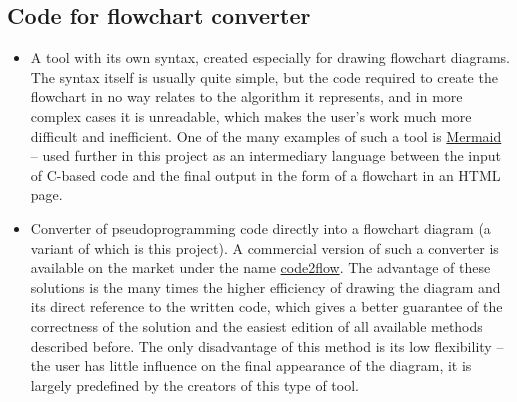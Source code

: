 	\subsection{Code for flowchart converter} 	
	\begin{itemize}
	\item
	A tool with its own syntax, created especially for drawing flowchart diagrams. The syntax itself is usually quite simple, but the code required to create the flowchart in no way relates to the algorithm it represents, and in more complex cases it is unreadable, which makes the user's work much more difficult and inefficient. One of the many examples of such a tool is \href{https://mermaid-js.github.io/mermaid/#/}{Mermaid} -- used further in this project as an intermediary language between the input of C-based code and the final output in the form of a flowchart in an HTML page.
	
	\item
	Converter of pseudoprogramming code directly into a flowchart diagram (a variant of which is this project). A commercial version of such a converter is available on the market under the name \href{https://code2flow.com}{code2flow}. The advantage of these solutions is the many times the higher efficiency of drawing the diagram and its direct reference to the written code, which gives a better guarantee of the correctness of the solution and the easiest edition of all available methods described before. The only disadvantage of this method is its low flexibility -- the user has little influence on the final appearance of the diagram, it is largely predefined by the creators of this type of tool.
	\end{itemize}
	
